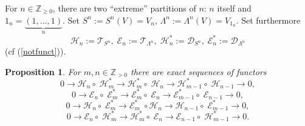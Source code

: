 \documentclass[11pt]{amsart}
\newcounter{theorem}
\newtheorem{prop}{Proposition}
\begin{document}
For $n\in\mathbb Z_{\geq 0}$, there are two ``extreme'' partitions of
$n$: $n$ itself and $1_n=\underbrace{(1,...,1)}_{n}$.
Set $S^n:=S^n(V)=V_n$, $\Lambda^n:=\Lambda^n(V)=V_{1_n}$.
Set furthermore
$$\mathcal H_n:=\mathcal T_{S^n} ,\; \mathcal E_n:=\mathcal T_{\Lambda^n},\;\mathcal H_n^*:=\mathcal D_{S^n},\; \mathcal E_n^*:=\mathcal D_{\Lambda^n}$$
(cf (\ref {notfunct})).
\begin{prop}\label{prop2} For $m,n\in\mathbb Z_{>0}$ 
there are exact sequences of functors 
\begin{equation}\label{ex1}
0\rightarrow \mathcal H_{n}\circ\;\mathcal  H_m^*\rightarrow
\mathcal H^*_{m}\circ\; \mathcal H_{n}\rightarrow \mathcal
H^*_{m-1}\circ\; \mathcal H_{n-1}\rightarrow 0,
\end{equation}
\begin{equation}\label{ex2}
0\rightarrow \mathcal E_{n}\circ\;\mathcal
E^*_{m}\rightarrow \mathcal E^*_{m}\circ\; \mathcal
E_{n}\rightarrow \mathcal E^*_{m-1}\circ\; \mathcal
E_{n-1}\rightarrow 0,
\end{equation}
\begin{equation}\label{ex3}
0\rightarrow \mathcal H_{n}\circ\;\mathcal
E^*_{m}\rightarrow \mathcal E^*_{m}\;\circ \mathcal
H_{n}\rightarrow  \mathcal H_{n-1}\circ\;\mathcal
E^*_{m-1}\rightarrow 0,
\end{equation}
\begin{equation}\label{ex4}
0\rightarrow \mathcal E_{n}\circ\;\mathcal
H^*_{m}\rightarrow  \mathcal H^*_{m}\circ\;\mathcal
E_{n}\rightarrow  \mathcal E_{n-1}\circ\;\mathcal
H^*_{m-1}\rightarrow 0.
\end{equation}
\end{prop}
\end{document}
